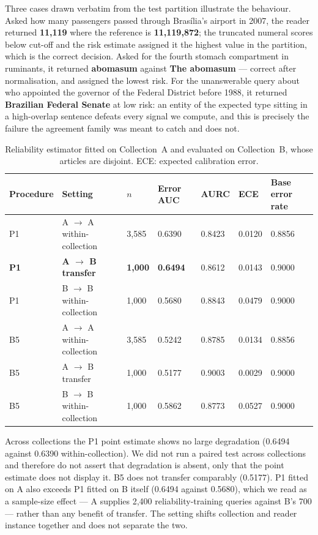 \documentclass[conference]{IEEEtran}
\begin{document}
Three cases drawn verbatim from the test partition illustrate the behaviour. Asked
how many passengers passed through Bras\'ilia's airport in 2007, the reader returned
\textbf{11,119} where the reference is \textbf{11,119,872}; the truncated numeral
scores below cut-off and the risk estimate assigned it the highest value in the
partition, which is the correct decision. Asked for the fourth stomach compartment
in ruminants, it returned \textbf{abomasum} against \textbf{The abomasum} --- correct
after normalisation, and assigned the lowest risk. For the unanswerable query about
who appointed the governor of the Federal District before 1988, it returned
\textbf{Brazilian Federal Senate} at low risk: an entity of the expected type sitting
in a high-overlap sentence defeats every signal we compute, and this is precisely
the failure the agreement family was meant to catch and does not.

\begin{table}[!t]
\renewcommand{\arraystretch}{1.2}
\caption{Reliability estimator fitted on Collection~A and evaluated on
Collection~B, whose articles are disjoint. ECE: expected calibration error.}
\label{tab:transfer}
\centering\footnotesize
\begin{tabular}{C{1.4cm}L{4.2cm}C{1.2cm}C{1.8cm}C{1.5cm}C{1.4cm}C{2.2cm}}
\toprule
\textbf{Procedure} & \textbf{Setting} & \textbf{$n$} & \textbf{Error AUC} &
\textbf{AURC} & \textbf{ECE} & \textbf{Base error rate} \\
\midrule
P1 & A $\rightarrow$ A within-collection & 3{,}585 & 0.6390 & 0.8423 & 0.0120 & 0.8856 \\
\textbf{P1} & \textbf{A $\rightarrow$ B transfer} & \textbf{1{,}000} & \textbf{0.6494} & 0.8612 & 0.0143 & 0.9000 \\
P1 & B $\rightarrow$ B within-collection & 1{,}000 & 0.5680 & 0.8843 & 0.0479 & 0.9000 \\
B5 & A $\rightarrow$ A within-collection & 3{,}585 & 0.5242 & 0.8785 & 0.0134 & 0.8856 \\
B5 & A $\rightarrow$ B transfer          & 1{,}000 & 0.5177 & 0.9003 & 0.0029 & 0.9000 \\
B5 & B $\rightarrow$ B within-collection & 1{,}000 & 0.5862 & 0.8773 & 0.0527 & 0.9000 \\
\bottomrule
\end{tabular}
\end{table}

Across collections the P1 point estimate shows no large degradation (0.6494 against
0.6390 within-collection). We did not run a paired test across collections and
therefore do not assert that degradation is absent, only that the point estimate
does not display it. B5 does not transfer comparably (0.5177). P1 fitted on A also
exceeds P1 fitted on B itself (0.6494 against 0.5680), which we read as a
sample-size effect --- A supplies 2{,}400 reliability-training queries against B's
700 --- rather than any benefit of transfer. The setting shifts collection and
reader instance together and does not separate the two.
\end{document}

